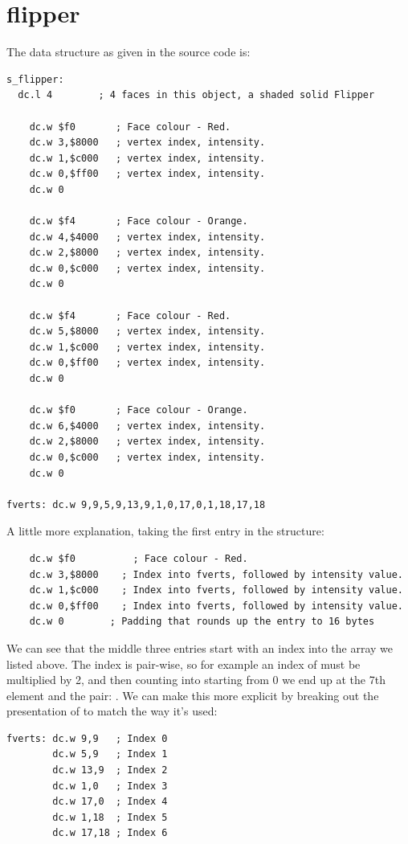\chapter{flipper}
\label{sec:listing}
\lstset{style=68KStyle}

The data structure as given in the source code is:

\begin{lstlisting}
s_flipper: 
  dc.l 4        ; 4 faces in this object, a shaded solid Flipper
    
	dc.w $f0       ; Face colour - Red.
	dc.w 3,$8000   ; vertex index, intensity.
	dc.w 1,$c000   ; vertex index, intensity.
	dc.w 0,$ff00   ; vertex index, intensity.
	dc.w 0
    
	dc.w $f4       ; Face colour - Orange.
	dc.w 4,$4000   ; vertex index, intensity.
	dc.w 2,$8000   ; vertex index, intensity.
	dc.w 0,$c000   ; vertex index, intensity.
	dc.w 0
    
	dc.w $f4       ; Face colour - Red.
	dc.w 5,$8000   ; vertex index, intensity.
	dc.w 1,$c000   ; vertex index, intensity.
	dc.w 0,$ff00   ; vertex index, intensity.
	dc.w 0
    
	dc.w $f0       ; Face colour - Orange.
	dc.w 6,$4000   ; vertex index, intensity.
	dc.w 2,$8000   ; vertex index, intensity.
	dc.w 0,$c000   ; vertex index, intensity.
	dc.w 0

fverts: dc.w 9,9,5,9,13,9,1,0,17,0,1,18,17,18
\end{lstlisting}

A little more explanation, taking the first entry in the structure:
\begin{lstlisting}
	dc.w $f0		  ; Face colour - Red.
	dc.w 3,$8000	; Index into fverts, followed by intensity value.
	dc.w 1,$c000	; Index into fverts, followed by intensity value.
	dc.w 0,$ff00	; Index into fverts, followed by intensity value.
	dc.w 0        ; Padding that rounds up the entry to 16 bytes
\end{lstlisting}

We can see that the middle three entries start with an index into the array  we listed above.
The index is pair-wise, so for example an index of  must be multiplied by 2, and then counting into 
starting from 0 we end up at the 7th element and the pair: . We can make this more explicit by breaking out the
presentation of  to match the way it's used:
\begin{lstlisting}
fverts: dc.w 9,9   ; Index 0
        dc.w 5,9   ; Index 1
        dc.w 13,9  ; Index 2
        dc.w 1,0   ; Index 3
        dc.w 17,0  ; Index 4
        dc.w 1,18  ; Index 5
        dc.w 17,18 ; Index 6
\end{lstlisting}

